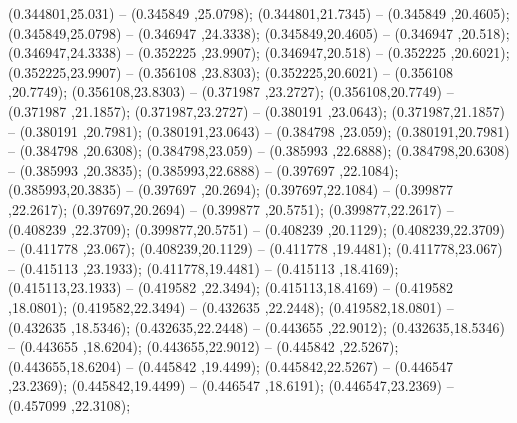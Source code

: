  (0.344801,25.031) -- (0.345849 ,25.0798);
 (0.344801,21.7345) -- (0.345849 ,20.4605);
 (0.345849,25.0798) -- (0.346947 ,24.3338);
 (0.345849,20.4605) -- (0.346947 ,20.518);
 (0.346947,24.3338) -- (0.352225 ,23.9907);
 (0.346947,20.518) -- (0.352225 ,20.6021);
 (0.352225,23.9907) -- (0.356108 ,23.8303);
 (0.352225,20.6021) -- (0.356108 ,20.7749);
 (0.356108,23.8303) -- (0.371987 ,23.2727);
 (0.356108,20.7749) -- (0.371987 ,21.1857);
 (0.371987,23.2727) -- (0.380191 ,23.0643);
 (0.371987,21.1857) -- (0.380191 ,20.7981);
 (0.380191,23.0643) -- (0.384798 ,23.059);
 (0.380191,20.7981) -- (0.384798 ,20.6308);
 (0.384798,23.059) -- (0.385993 ,22.6888);
 (0.384798,20.6308) -- (0.385993 ,20.3835);
 (0.385993,22.6888) -- (0.397697 ,22.1084);
 (0.385993,20.3835) -- (0.397697 ,20.2694);
 (0.397697,22.1084) -- (0.399877 ,22.2617);
 (0.397697,20.2694) -- (0.399877 ,20.5751);
 (0.399877,22.2617) -- (0.408239 ,22.3709);
 (0.399877,20.5751) -- (0.408239 ,20.1129);
 (0.408239,22.3709) -- (0.411778 ,23.067);
 (0.408239,20.1129) -- (0.411778 ,19.4481);
 (0.411778,23.067) -- (0.415113 ,23.1933);
 (0.411778,19.4481) -- (0.415113 ,18.4169);
 (0.415113,23.1933) -- (0.419582 ,22.3494);
 (0.415113,18.4169) -- (0.419582 ,18.0801);
 (0.419582,22.3494) -- (0.432635 ,22.2448);
 (0.419582,18.0801) -- (0.432635 ,18.5346);
 (0.432635,22.2448) -- (0.443655 ,22.9012);
 (0.432635,18.5346) -- (0.443655 ,18.6204);
 (0.443655,22.9012) -- (0.445842 ,22.5267);
 (0.443655,18.6204) -- (0.445842 ,19.4499);
 (0.445842,22.5267) -- (0.446547 ,23.2369);
 (0.445842,19.4499) -- (0.446547 ,18.6191);
 (0.446547,23.2369) -- (0.457099 ,22.3108);
